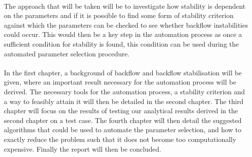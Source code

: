 \\
The approach that will be taken will be to investigate how stability is dependent on the parameters and if it is possible to find some form of stability criterion against which the parameters can be checked to see whether backflow instabilities could occur. This would then be a key step in the automation process as once a sufficient condition for stability is found, this condition can be used during the automated parameter selection procedure.\\
\\
In the first chapter, a background of backflow and backflow stabilisation will be given, where an important result necessary for the automation process will be derived. The necessary tools for the automation process, a stability criterion and a way to feasibly attain it will then be detailed in the second chapter. The third chapter will focus on the results of testing our analytical results derived in the second chapter on a test case. The fourth chapter will then detail the suggested algorithms that could be used to automate the parameter selection, and how to exactly reduce the problem such that it does not become too computationally expensive. Finally the report will then be concluded.